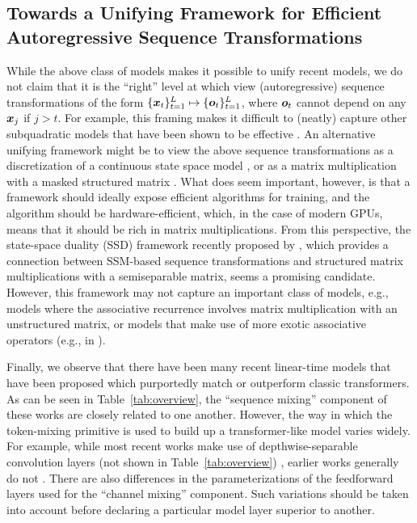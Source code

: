 \subsection{Towards a  Unifying Framework for Efficient Autoregressive Sequence Transformations}
\vspace{-2mm}
While the above class of models  makes it possible to unify recent models, we do not claim that it is the ``right'' level at   which view  (autoregressive) sequence transformations of the form $\{{\bm{x}}_t\}_{t=1}^L \mapsto \{{\bm{o}}_t\}_{t=1}^L$, where    ${\bm{o}}_t$ cannot depend on any ${\bm{x}}_j$ if  $j>t$. For example, this framing makes it difficult to (neatly) capture other subquadratic models that have been shown to be effective \cite{zaheer2020big,kitaev2020reformer,roy2021efficient,poli_hyena_2023}. An alternative unifying framework might be to view  the above sequence transformations as a discretization of a continuous state space model \cite{s4,smith_simplified_2023,gu_mamba_2023}, or as a  matrix multiplication with a masked structured matrix \cite{nguyen2021fmmformer,qin2023toeplitz,kang2023fast,mamba2}. What does seem important, however, is that a framework should ideally expose efficient algorithms for training, and  the algorithm should be hardware-efficient, which, in the case of modern GPUs, means that it should be rich in matrix multiplications. From this perspective, the state-space duality (SSD) framework recently proposed by \citet{mamba2}, which provides a connection between SSM-based sequence transformations and structured matrix multiplications with a semiseparable matrix, seems a promising candidate. However, this framework may not capture an important class of models, e.g.,  models where the associative recurrence involves matrix multiplication with an unstructured matrix, or models that make use of more exotic associative operators (e.g., in \citet{Peng2018RationalR}).

Finally, we observe that there have been many recent linear-time models that have been proposed which purportedly match or outperform classic transformers.  As can be seen in Table~\ref{tab:overview}, the ``sequence mixing'' component of these works are closely related to one another. 
However, the way in which the token-mixing primitive is used to build up a transformer-like model varies widely. For example, while most recent works make use of depthwise-separable convolution layers (not shown in Table~\ref{tab:overview}) \cite{gu_mamba_2023,beck2024xlstm,mamba2,chou2024metala,yang2024gateddeltanetworksimproving}, earlier works generally do not \cite{katharopoulos_transformers_2020,schlag_linear_2021,peng_random_2021}. There are also differences in the parameterizations of the feedforward layers used for the ``channel mixing'' component. Such variations should be  taken into account before declaring a particular model layer superior to another.


